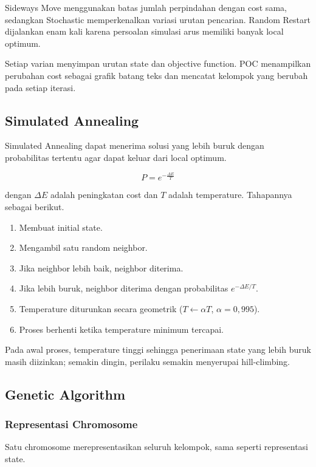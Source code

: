 \documentclass[11pt,a4paper]{article}
\begin{document}
Sideways Move menggunakan batas jumlah perpindahan dengan cost sama, sedangkan Stochastic memperkenalkan variasi urutan pencarian. Random Restart dijalankan enam kali karena persoalan simulasi arus memiliki banyak local optimum.

Setiap varian menyimpan urutan state dan objective function. POC menampilkan perubahan cost sebagai grafik batang teks dan mencatat kelompok yang berubah pada setiap iterasi.

\subsection{Simulated Annealing}

Simulated Annealing dapat menerima solusi yang lebih buruk dengan probabilitas tertentu agar dapat keluar dari local optimum.

\[
P = e^{-\frac{\Delta E}{T}}
\]

dengan $\Delta E$ adalah peningkatan cost dan $T$ adalah temperature. Tahapannya sebagai berikut.

\begin{enumerate}[leftmargin=2em,itemsep=0.1em]
  \item Membuat initial state.
  \item Mengambil satu random neighbor.
  \item Jika neighbor lebih baik, neighbor diterima.
  \item Jika lebih buruk, neighbor diterima dengan probabilitas $e^{-\Delta E / T}$.
  \item Temperature diturunkan secara geometrik ($T \leftarrow \alpha T$, $\alpha = 0{,}995$).
  \item Proses berhenti ketika temperature minimum tercapai.
\end{enumerate}

Pada awal proses, temperature tinggi sehingga penerimaan state yang lebih buruk masih diizinkan; semakin dingin, perilaku semakin menyerupai hill-climbing.

\subsection{Genetic Algorithm}

\subsubsection{Representasi Chromosome}

Satu chromosome merepresentasikan seluruh kelompok, sama seperti representasi state.
\end{document}
